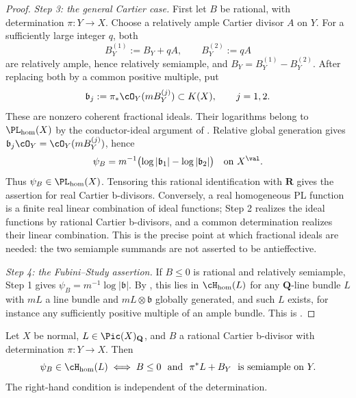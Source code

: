 \begin{proof}
\medskip
\noindent\emph{Step 3: the general Cartier case.}
First let $B$ be rational, with determination $\pi:Y\to X$.  Choose a
relatively ample Cartier divisor $A$ on $Y$.  For a sufficiently large
integer $q$, both
\[
 B_Y^{(1)}:=B_Y+qA,
 \qquad B_Y^{(2)}:=qA
\]
are relatively ample, hence relatively semiample, and
$B_Y=B_Y^{(1)}-B_Y^{(2)}$.  After replacing both by a common positive
multiple, put
\[
 \mathfrak b_j:=\pi_*\cO_Y(mB_Y^{(j)})\subset K(X),\qquad j=1,2.
\]
These are nonzero coherent fractional ideals. Their logarithms belong to
$\PL_{\mathrm{hom}}(X)$ by the conductor-ideal argument of
\cite[Example~6.4]{BJ22}. Relative global
generation gives
$\mathfrak b_j\cO_Y=\cO_Y(mB_Y^{(j)})$, hence
\[
 \psi_B=m^{-1}\bigl(\log|\mathfrak b_1|
                    -\log|\mathfrak b_2|\bigr)
 \quad\text{on }X^{\val}.
\]
Thus $\psi_B\in\PL_{\mathrm{hom}}(X)$.  Tensoring this rational
identification with $\mathbf R$ gives the assertion for real Cartier
b-divisors.  Conversely, a real homogeneous PL function is a finite real
linear combination of ideal functions; Step 2 realizes the ideal functions
by rational Cartier b-divisors, and a common determination realizes their
linear combination.  This is the precise point at which fractional ideals
are needed: the two semiample summands are not asserted to be
antieffective.

\medskip
\noindent\emph{Step 4: the Fubini--Study assertion.}
If $B\leq0$ is rational and relatively semiample, Step 1 gives
$\psi_B=m^{-1}\log|\mathfrak b|$.  By
, this lies in
$\cH_{\mathrm{hom}}(L)$ for any $\mathbf Q$-line bundle $L$ with
$mL$ a line bundle and $mL\otimes\mathfrak b$ globally generated, and
such $L$ exists, for instance any sufficiently positive multiple of an
ample bundle.  This is \cite[Theorem~6.32]{BJ22}.
\end{proof}

\begin{theorem}
\label{thm:ch35-semiample-criterion}
Let $X$ be normal, $L\in\Pic(X)_{\mathbf Q}$, and $B$ a rational
Cartier b-divisor with determination $\pi:Y\to X$.  Then
\begin{equation}
\label{eq:ch35-semiample-criterion}
 \psi_B\in\cH_{\mathrm{hom}}(L)
 \iff
 B\leq0\ \text{ and }\ \pi^*L+B_Y\ \text{ is semiample on }Y .
\end{equation}
The right-hand condition is independent of the determination.
\end{theorem}

